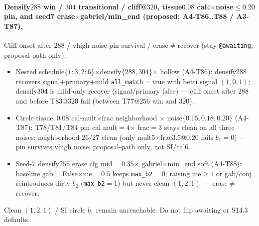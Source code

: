 \documentclass[11pt]{article}
\begin{document}
\paragraph{Densify$288$ win / $304$ transitional / cliff@$320$, tissue$0.08$
cal$4$$\times$noise$\le 0.20$ pin, and seed7 erase$\times$gabriel/min\_end
(proposed; A4-T86..T88 / A3-T87).}
Cliff onset after $288$ / vhigh-noise pin survival / erase$\neq$recover
(stay \texttt{@awaiting}; proposal-path only):
\begin{itemize}[leftmargin=1.5em]
  \item Nested schedule$\{1{:}3,2{:}6\}$$\times$densify$\{288,304\}$$\times$
  hollow (A4-T86): densify$288$ recovers signal$+$primary$+$mild
  \texttt{all\_match}${=}$true with betti signal $(1,0,1)$; densify$304$
  is mild-only recover (signal/primary false) --- cliff onset after
  $288$ and before T83@$320$ fail (between T77@$256$ win and $320$).
  \item Circle tissue~$0.08$ cal-mult$\times$frac neighborhood $\times$
  noise$\{0.15,0.18,0.20\}$ (A4-T87): T78/T81/T84 pin cal mult${=}4$$\times$
  frac${=}3$ stays clean on all three noises; neighborhood $26/27$ clean
  (only mult$5$$\times$frac$3.5$@$0.20$ fails $b_1{=}0$) --- pin survives
  vhigh noise; proposal-path only, not SI/cal$6$.
  \item Seed-$7$ densify$256$ erase cfg mid${=}0.35$$\times$
  gabriel$\times$min\_end soft (A4-T88): baseline
  gab${=}$False$\times$me${=}0.5$ keeps \texttt{max\_b2}${=}0$; raising
  me$\ge 1$ or gab/conj reintroduces dirty-$b_2$ (\texttt{max\_b2}${=}1$)
  but never clean $(1,2,1)$ --- erase$\neq$recover.
\end{itemize}
Clean $(1,2,1)$ / SI circle $b_1$ remain unreachable. Do not flip
awaiting or S14.3 defaults.
\end{document}
